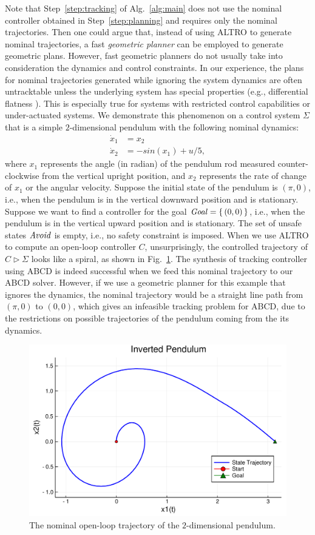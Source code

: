Note that Step~\ref{step:tracking} of Alg.~\ref{alg:main} does not use the nominal controller obtained in Step~\ref{step:planning} and requires only the nominal trajectories.
Then one could argue that, instead of using ALTRO to generate nominal trajectories, a fast \emph{geometric planner} \cite{Kavraki1996rrt} can be employed to generate geometric plans.
However, fast geometric planners do not usually take into consideration the dynamics and control constraints. In our experience, the plans for nominal trajectories generated while ignoring the system dynamics are often untracktable unless the underlying system has special properties (e.g., differential flatness \cite{}).
This is especially true for systems with restricted control capabilities or under-actuated systems.
We demonstrate this phenomenon on a control system $\Sigma$ that is a simple $2$-dimensional pendulum with the following nominal dynamics:
	\begin{align*}
		\dot{x}_1 &= x_2\\
		\dot{x}_2 &= -sin(x_1) + u/5,
	\end{align*}
where $x_1$ represents the angle (in radian) of the pendulum rod measured counter-clockwise from the vertical upright position, and $x_2$ represents the rate of change of $x_1$ or the angular velocity.
Suppose the initial state of the pendulum is $(\pi,0)$, i.e., when the pendulum is in the vertical downward position and is stationary.
Suppose we want to find a controller for the goal $\mathit{Goal} = \set{(0,0)}$, i.e., when the pendulum is in the vertical upward position and is stationary.
The set of unsafe states $\mathit{Avoid}$ is empty, i.e., no safety constraint is imposed.
When we use ALTRO to compute an open-loop controller $C$, unsurprisingly, the controlled trajectory of $C\triangleright \Sigma$ looks like a spiral, as shown in Fig.~\ref{fig:traj 2d pendulum}.
The synthesis of tracking controller using ABCD is indeed successful when we feed this nominal trajectory to our ABCD solver.
However, if we use a geometric planner for this example that ignores the dynamics, the nominal trajectory would be a straight line path from $(\pi,0)$ to $(0,0)$, which gives an infeasible tracking problem for ABCD, due to the restrictions on possible trajectories of the pendulum coming from the its dynamics.
	\begin{figure}
		\includegraphics[scale=0.2]{figures/2d_pendulum_spiral}
		\caption{The nominal open-loop trajectory of the $2$-dimensional pendulum. }
		\label{fig:traj 2d pendulum}
	\end{figure}
